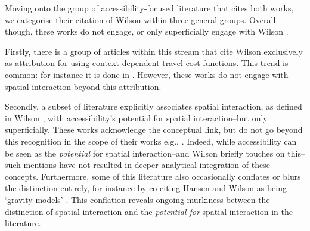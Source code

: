 \documentclass[
  10pt,
  letterpaper,
]{article}
\begin{document}
Moving onto the group of accessibility-focused literature that cites
both works, we categorise their citation of Wilson \citep{wilson1971}
within three general groups. Overall though, these works do not engage,
or only superficially engage with Wilson \citep{wilson1971}.

Firstly, there is a group of articles within this stream that cite
Wilson \citep{wilson1971} exclusively as attribution for using
context-dependent travel cost functions. This trend is common: for
instance it is done in
\citep{handyMeasuringAccessibilityExploration1997, weibullNumericalMeasurementAccessibility1980, kwan1998space, shenLocationCharacteristicsInnercity1998, ashiru2003space, rau2012spatial, pan2013impacts, margaridacondecomelhoradoImpactMeasuringInternal2016, caschili2015accessibility, grengs2015nonwork, pan2020measuring, chia2020extending, roblot2021participation, sharifiasl2023incorporating, kharel2024examining}.
However, these works do not engage with spatial interaction beyond this
attribution.

Secondly, a subset of literature explicitly associates spatial
interaction, as defined in Wilson \citep{wilson1971}, with
accessibility's potential for spatial interaction--but only
superficially. These works acknowledge the conceptual link, but do not
go beyond this recognition in the scope of their works e.g.,
\citep{grengs2010job, millerMeasuringSpaceTimeAccessibility1999, giuliano2010accessibility, grengs2010intermetropolitan, grengs2012equity, levine2012does, levinson2012positive, tong2015transportation, liu2015spatial, he2017measuring, wuUnifyingAccess2020, ng2022reflection, naqavi2023mobility, suel2024measuring}.
Indeed, while accessibility can be seen as the \emph{potential} for
spatial interaction--and Wilson \citep{wilson1971} briefly touches on
this--such mentions have not resulted in deeper analytical integration
of these concepts. Furthermore, some of this literature also
occasionally conflates or blurs the distinction entirely, for instance
by co-citing Hansen and Wilson as being `gravity models'
\citep[e.g.,][]{liu2004accessibility, dai2017visualization, shen2019segregation, chia2020extending}.
This conflation reveals ongoing murkiness between the distinction of
spatial interaction and the \emph{potential for} spatial interaction in
the literature.
\end{document}
